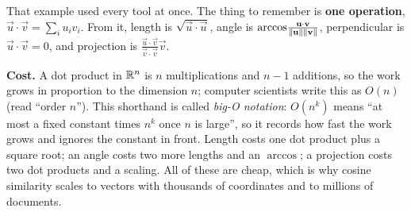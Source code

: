 \begin{recoverybox}
That example used every tool at once. The thing to remember is \textbf{one operation},
$\vec u\cdot\vec v = \sum_i u_iv_i$. From it, length is $\sqrt{\vec u\cdot\vec u}$,
angle is $\arccos\!\frac{\mathbf{u}\cdot\mathbf{v}}{\lVert\mathbf{u}\rVert\lVert\mathbf{v}\rVert}$,
perpendicular is $\vec u\cdot\vec v = 0$, and projection is
$\frac{\vec u\cdot\vec v}{\vec v\cdot\vec v}\vec v$.

\textbf{Cost.} A dot product in $\mathbb{R}^n$ is $n$ multiplications and $n-1$ additions,
so the work grows in proportion to the dimension $n$; computer scientists write this
as $O(n)$ (read ``order $n$''). This shorthand is called \emph{big-O notation}:
$O(n^k)$ means ``at most a fixed constant times $n^k$ once $n$ is large'', so it
records how fast the work grows and ignores the constant in front. Length costs one dot product plus a square
root; an angle costs two more lengths and an $\arccos$; a projection costs two dot
products and a scaling. All of these are cheap, which is why
cosine similarity scales to vectors with thousands of coordinates and to millions of
documents.
\end{recoverybox}

